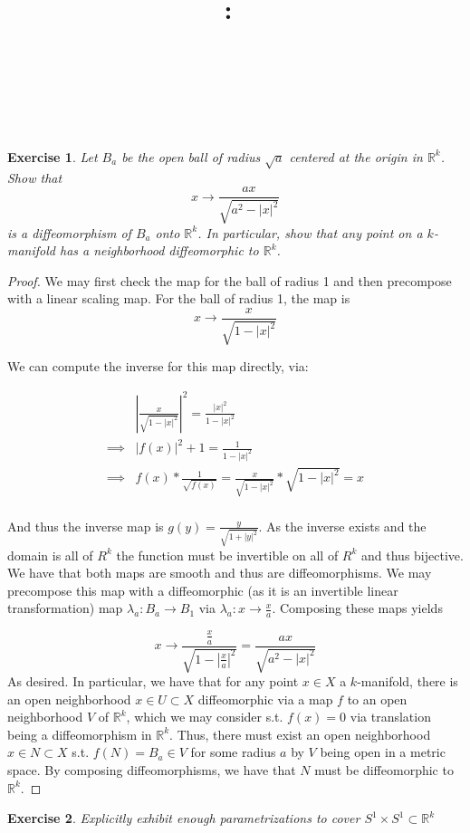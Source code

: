 \documentclass{article}
\title{
    \vspace{2in}
    \textmd{\textbf{\hmwkClass:\ \hmwkTitle}}\\
    \vspace{0.1in}
    \textmd{\hmwkDueDate} \\
    \vspace{0.2in}\large{\textit{\hmwkClassInstructor\  }}
    \vspace{2in}
}
\author{\hmwkAuthorName}
\date{}
\newtheorem{exercise}{Exercise}
\begin{document}
\maketitle

\pagebreak

\begin{exercise}
  Let $B_{a}$ be the open ball of radius $\sqrt{a}$ centered at the origin in $\mathbb{R}^{k}$. Show that
  \[ x \to \frac{ax}{\sqrt{a^{2}-|x|^{2}}} \]
is a diffeomorphism of $B_{a}$ onto $\mathbb{R}^{k}$. In particular, show that any point on a $k$-manifold has a neighborhood diffeomorphic to $\mathbb{R}^{k}$.
  \end{exercise}

  \begin{proof}
    We may first check the map for the ball of radius 1 and then precompose with a linear scaling map. For the ball of radius 1, the map is
    \[ x \to \frac{x}{\sqrt{1-|x|^{2}}} \]

    We can compute the inverse for this map directly, via:

    \begin{align*}  & \left|\frac{x}{\sqrt{1-|x|^{2}}}\right|^{2} = \frac{|x|^{2}}{1 - |x|^{2}} \\
        \implies & |f(x)|^{2} + 1 = \frac{1}{1-|x|^{2}} \\
                   \implies & f(x)* \frac{1}{\sqrt{f(x)}} =  \frac{x}{\sqrt{1-|x|^{2}}}*\sqrt{1-|x|^{2}} = x\\ \end{align*}

                 And thus the inverse map is $g(y) = \frac{y}{\sqrt{1+|y|^{2}}}$. As the inverse exists and the domain is all of $R^{k}$ the function must be invertible on all of $R^{k}$ and thus bijective. We have that both maps are smooth and thus are diffeomorphisms. We may precompose this map with a diffeomorphic (as it is an invertible linear transformation) map $\lambda_{a}: B_{a} \to B_{1}$ via $\lambda_{a}: x \to \frac{x}{a}$. Composing these maps yields

                 \[ x \to \frac{\frac{x}{a}}{\sqrt{1 - \left|\frac{x}{a}\right|^{2}}} = \frac{ax}{\sqrt{a^{2} - |x|^{2}}}\]
As desired. In particular, we have that for any point $x \in X$ a $k$-manifold, there is an open neighborhood $x \in U \subset X$ diffeomorphic via a map $f$ to an open neighborhood $V$ of $\mathbb{R}^{k}$, which we may consider s.t. $f(x) = 0$ via translation being a diffeomorphism in $\mathbb{R}^{k}$. Thus, there must exist an open neighborhood $x \in N \subset X$ s.t. $f(N) = B_{a} \in V$ for some radius $a$ by $V$ being open in a metric space. By composing diffeomorphisms, we have that $N$ must be diffeomorphic to $\mathbb{R}^{k}$. 
    \end{proof}
\begin{exercise}
Explicitly exhibit enough parametrizations to cover $S^{1}\times S^{1} \subset \mathbb{R}^{k}$
  \end{exercise}
\end{document}
